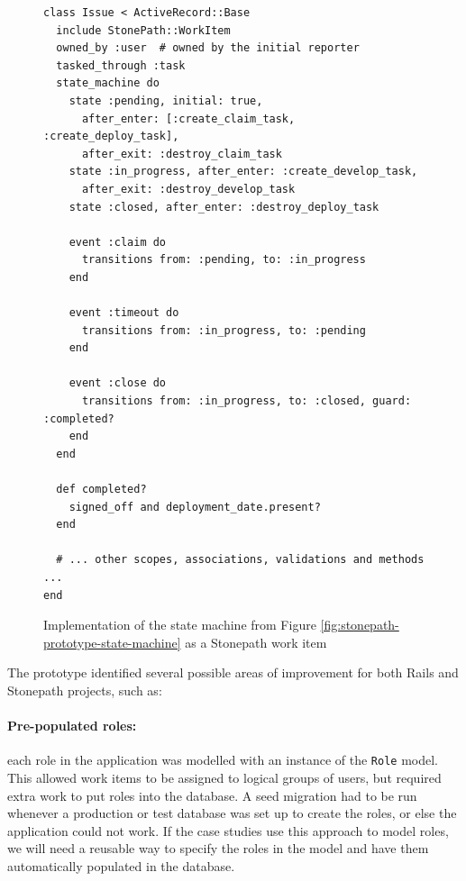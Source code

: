 \documentclass[document.tex]{subfiles}
\begin{document}

\begin{figure}[!ht]
  \begin{lstlisting}
class Issue < ActiveRecord::Base
  include StonePath::WorkItem
  owned_by :user  # owned by the initial reporter
  tasked_through :task
  state_machine do
    state :pending, initial: true,
      after_enter: [:create_claim_task, :create_deploy_task],
      after_exit: :destroy_claim_task
    state :in_progress, after_enter: :create_develop_task,
      after_exit: :destroy_develop_task
    state :closed, after_enter: :destroy_deploy_task

    event :claim do
      transitions from: :pending, to: :in_progress
    end

    event :timeout do
      transitions from: :in_progress, to: :pending
    end

    event :close do
      transitions from: :in_progress, to: :closed, guard: :completed?
    end
  end

  def completed?
    signed_off and deployment_date.present?
  end

  # ... other scopes, associations, validations and methods ...
end
  \end{lstlisting}
  \caption{Implementation of the state machine from Figure \ref{fig:stonepath-prototype-state-machine} as a Stonepath work item}
  \label{fig:stonepath-prototype-workitem}
\end{figure}

The prototype identified several possible areas of improvement for both Rails and Stonepath projects, such as:

\paragraph{Pre-populated roles:} each role in the application was modelled with an instance of the \verb!Role! model. This allowed work items to be assigned to logical groups of users, but required extra work to put roles into the database. A seed migration had to be run whenever a production or test database was set up to create the roles, or else the application could not work. If the case studies use this approach to model roles, we will need a reusable way to specify the roles in the model and have them automatically populated in the database.
\end{document}
